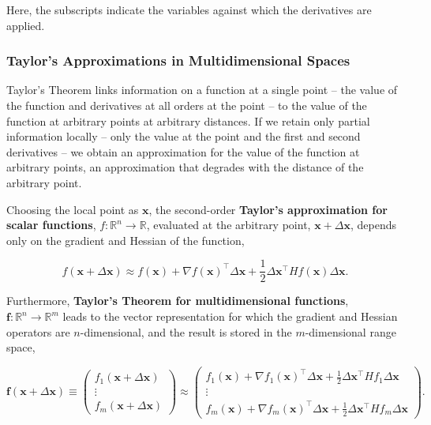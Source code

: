 \documentclass[12pt, twoside, draft]{article}
\begin{document}
Here, the subscripts indicate the variables against which the derivatives are applied.

\subsubsection{Taylor's Approximations in Multidimensional Spaces}\label{taylors_theorem}
Taylor's Theorem links information on a function at a single point -- the value of the function and derivatives at all orders at the point -- to the value of the function at arbitrary points at arbitrary distances.  If we retain only partial information locally -- only the value at the point and the first and second derivatives -- we obtain an approximation for the value of the function at arbitrary points, an approximation that degrades with the distance of the arbitrary point.

Choosing the local point as $\mathbf{x}$, the second-order \textbf{Taylor's approximation for scalar functions}, $f: \mathbb{R}^n \rightarrow \mathbb{R}$, evaluated at the arbitrary point, $\mathbf{x} + \Delta \mathbf{x}$,  depends only on the gradient and Hessian of the function,

\begin{equation}\label{eq:Taylors_theorem_scalar}
f(\mathbf{x} + \Delta \mathbf{x}) \approx f(\mathbf{x}) + \nabla f(\mathbf{x})^\top \Delta \mathbf{x} + \frac{1}{2} \Delta \mathbf{x}^\top H f(\mathbf{x}) \Delta \mathbf{x}.
\end{equation}

Furthermore, \textbf{Taylor's Theorem for multidimensional functions}, $\mathbf{f}: \mathbb{R}^n \rightarrow \mathbb{R}^m$ leads to the vector representation for which the gradient and Hessian operators are $n$-dimensional, and the result is stored in the $m$-dimensional range space,

\begin{equation}\label{eq:Taylors_theorem_vector}
\mathbf{f}(\mathbf{x} + \Delta \mathbf{x}) \equiv 
\begin{pmatrix}
f_1(\mathbf{x} + \Delta \mathbf{x}) \\
\vdots \\
f_m(\mathbf{x} + \Delta \mathbf{x})
\end{pmatrix}
\approx 
\begin{pmatrix}
f_1(\mathbf{x}) + \nabla f_1(\mathbf{x})^\top \Delta \mathbf{x} + \frac{1}{2} \Delta \mathbf{x}^\top Hf_1 \Delta \mathbf{x} \\
\vdots \\
f_m(\mathbf{x}) + \nabla f_m(\mathbf{x})^\top \Delta \mathbf{x} + \frac{1}{2} \Delta \mathbf{x}^\top Hf_m \Delta \mathbf{x}
\end{pmatrix}.
\end{equation}
\end{document}
